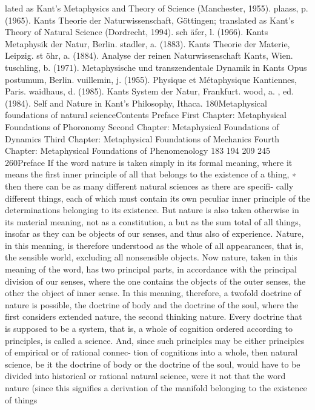 lated as Kant’s Metaphysics and Theory of Science (Manchester, 1955).
plaass, p. (1965). Kants Theorie der Naturwissenschaft, Göttingen; translated as
Kant’s Theory of Natural Science (Dordrecht, 1994).
sch äfer, l. (1966). Kants Metaphysik der Natur, Berlin.
stadler, a. (1883). Kants Theorie der Materie, Leipzig.
st öhr, a. (1884). Analyse der reinen Naturwissenschaft Kants, Wien.
tuschling, b. (1971). Metaphysische und transzendentale Dynamik in Kants Opus
postumum, Berlin.
vuillemin, j. (1955). Physique et Métaphysique Kantiennes, Paris.
waidhaus, d. (1985). Kants System der Natur, Frankfurt.
wood, a. , ed. (1984). Self and Nature in Kant’s Philosophy, Ithaca.
180Metaphysical foundations of natural scienceContents
Preface
First Chapter: Metaphysical Foundations of Phoronomy
Second Chapter: Metaphysical Foundations of Dynamics
Third Chapter: Metaphysical Foundations of Mechanics
Fourth Chapter: Metaphysical Foundations of Phenomenology
183
194
209
245
260Preface
If the word nature is taken simply in its formal meaning, where it means
the ﬁrst inner principle of all that belongs to the existence of a thing, ∗
then there can be as many different natural sciences as there are speciﬁ-
cally different things, each of which must contain its own peculiar inner
principle of the determinations belonging to its existence. But nature is
also taken otherwise in its material meaning, not as a constitution, a but
as the sum total of all things, insofar as they can be objects of our senses, and
thus also of experience. Nature, in this meaning, is therefore understood
as the whole of all appearances, that is, the sensible world, excluding
all nonsensible objects. Now nature, taken in this meaning of the word,
has two principal parts, in accordance with the principal division of our
senses, where the one contains the objects of the outer senses, the other
the object of inner sense. In this meaning, therefore, a twofold doctrine
of nature is possible, the doctrine of body and the doctrine of the soul, where
the ﬁrst considers extended nature, the second thinking nature.
Every doctrine that is supposed to be a system, that is, a whole of
cognition ordered according to principles, is called a science. And, since
such principles may be either principles of empirical or of rational connec-
tion of cognitions into a whole, then natural science, be it the doctrine of
body or the doctrine of the soul, would have to be divided into historical
or rational natural science, were it not that the word nature (since this
signiﬁes a derivation of the manifold belonging to the existence of things

